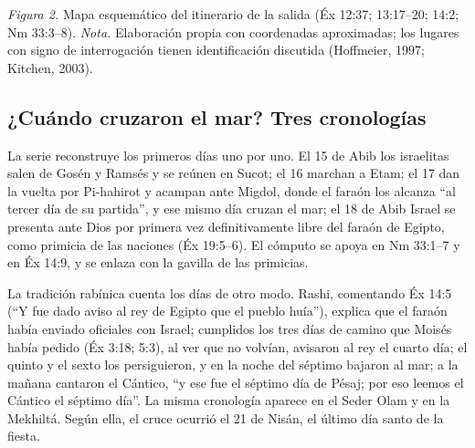 \documentclass[11pt,letterpaper]{article}
\begin{document}
\begin{center}
\begin{minipage}{\linewidth}
\par\nopagebreak
{\footnotesize\color{sepia}\textit{Figura 2.} Mapa esquemático del itinerario de la salida (Éx 12:37; 13:17--20; 14:2; Nm 33:3--8). \textit{Nota.} Elaboración propia con coordenadas aproximadas; los lugares con signo de interrogación tienen identificación discutida (Hoffmeier, 1997; Kitchen, 2003).}
\end{minipage}\end{center}

\subsection{¿Cuándo cruzaron el mar? Tres cronologías}
La serie reconstruye los primeros días uno por uno. El 15 de Abib los israelitas salen de Gosén y Ramsés y se reúnen en Sucot; el 16 marchan a Etam; el 17 dan la vuelta por Pi-hahirot y acampan ante Migdol, donde el faraón los alcanza ``al tercer día de su partida'', y ese mismo día cruzan el mar; el 18 de Abib Israel se presenta ante Dios por primera vez definitivamente libre del faraón de Egipto, como primicia de las naciones (Éx 19:5--6). El cómputo se apoya en Nm 33:1--7 y en Éx 14:9, y se enlaza con la gavilla de las primicias.

La tradición rabínica cuenta los días de otro modo. Rashi, comentando Éx 14:5 (``Y fue dado aviso al rey de Egipto que el pueblo huía''), explica que el faraón había enviado oficiales con Israel; cumplidos los tres días de camino que Moisés había pedido (Éx 3:18; 5:3), al ver que no volvían, avisaron al rey el cuarto día; el quinto y el sexto los persiguieron, y en la noche del séptimo bajaron al mar; a la mañana cantaron el Cántico, ``y ese fue el séptimo día de Pésaj; por eso leemos el Cántico el séptimo día''. La misma cronología aparece en el Seder Olam y en la Mekhiltá. Según ella, el cruce ocurrió el 21 de Nisán, el último día santo de la fiesta.
\end{document}
